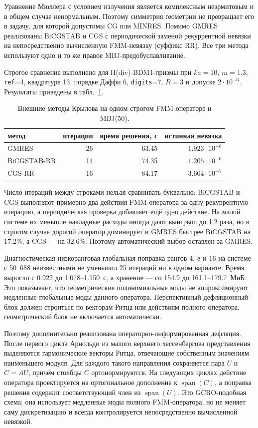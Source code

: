 \documentclass[12pt,a4paper]{article}
\begin{document}
Уравнение Мюллера с условием излучения является комплексным неэрмитовым и в
общем случае ненормальным. Поэтому симметрия геометрии не превращает его в
задачу, для которой допустимы CG или MINRES. Помимо GMRES реализованы
BiCGSTAB и CGS с периодической заменой рекуррентной невязки на непосредственно
вычисленную FMM-невязку (суффикс RR). Все три метода используют одно и то же
правое MBJ-предобуславливание.

Строгое сравнение выполнено для H(div)-BDM1-призмы при $ka=10$, $m=1.3$,
\texttt{ref}=4, квадратуре 13, порядке Даффи 6, \texttt{digits}=7, $R=3$ и
допуске $2\cdot10^{-6}$. Результаты приведены в
табл.~\ref{tab:krylov-comparison}.

\begin{table}[H]
\centering
\caption{Внешние методы Крылова на одном строгом FMM-операторе и MBJ(50).}
\label{tab:krylov-comparison}
\begin{tabular}{lrrr}
\toprule
метод & итерации & время решения, с & истинная невязка\\
\midrule
GMRES       & 26 & 63.45 & $1.923\cdot10^{-6}$\\
BiCGSTAB-RR & 14 & 74.35 & $1.205\cdot10^{-6}$\\
CGS-RR      & 16 & 84.17 & $3.604\cdot10^{-7}$\\
\bottomrule
\end{tabular}
\end{table}

Число итераций между строками нельзя сравнивать буквально: BiCGSTAB и CGS
выполняют примерно два действия FMM-оператора за одну рекуррентную итерацию, а
периодическая проверка добавляет ещё одно действие. На малой системе их
меньшие накладные расходы иногда дают выигрыш до 1.2 раза, но в строгом случае
дорогой оператор доминирует и GMRES быстрее BiCGSTAB на 17.2\%, а CGS --- на
32.6\%. Поэтому автоматический выбор оставлен за GMRES.

Диагностическая низкоранговая глобальная поправка рангов 4, 8 и 16 на системе с 50~688 неизвестными
не уменьшил 25 итераций ни в одном варианте. Время выросло с 0.922 до
1.078--1.150~с, а хранение --- со 154.9 до 161.1--179.7~МиБ. Это показывает,
что геометрические полиномиальные моды не аппроксимируют медленные глобальные
моды данного оператора. Перспективный дефляционный блок должен строиться по
векторам Ритца или действиям полного оператора; геометрический блок не
включается автоматически.

Поэтому дополнительно реализована операторно-информированная дефляция. После
первого цикла Арнольди из малого верхнего хессенбергова представления
выделяются гармонические векторы Ритца, отвечающие собственным значениям
наименьшего модуля. Для каждого такого направления сохраняется пара
$U$ и $C=AU$, причём столбцы $C$ ортонормируются. На следующих циклах
действие оператора проектируется на ортогональное дополнение к
$\operatorname{span}(C)$, а поправка решения содержит соответствующий член из
$\operatorname{span}(U)$. Это GCRO-подобная схема: она использует медленные
моды полного FMM-оператора, но не меняет саму дискретизацию и всегда
контролируется непосредственно вычисленной невязкой.
\end{document}
